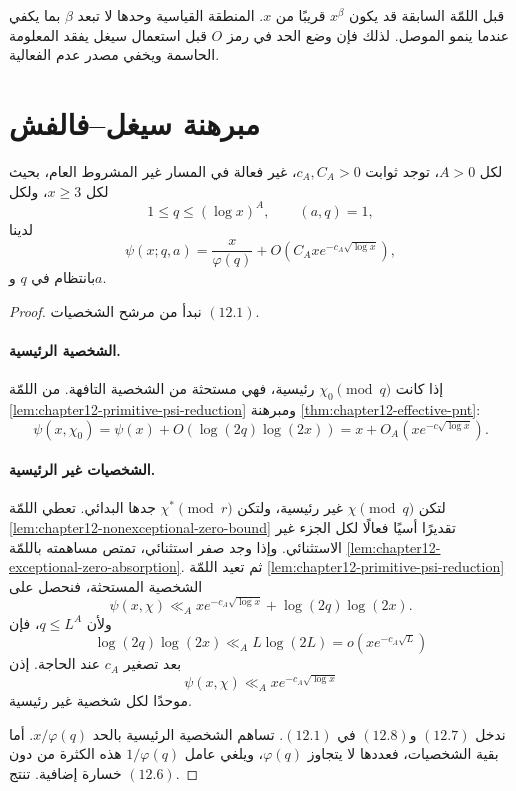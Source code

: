 \begin{remark}
قبل اللمّة السابقة قد يكون \(x^\beta\) قريبًا من \(x\). المنطقة القياسية
وحدها لا تبعد \(\beta\) بما يكفي عندما ينمو الموصل. لذلك فإن وضع الحد في
رمز \(O\) قبل استعمال سيغل يفقد المعلومة الحاسمة ويخفي مصدر عدم الفعالية.
\end{remark}

\section{مبرهنة سيغل--فالفش}

\begin{theorem}
\label{thm:chapter12-siegel-walfisz-psi}
\provedhere
لكل \(A>0\)، توجد ثوابت \(c_A,C_A>0\)، غير فعالة في المسار غير المشروط
العام، بحيث لكل \(x\ge3\)، ولكل
\[
1\le q\le(\log x)^A,
\qquad (a,q)=1,
\]
لدينا
\[
\psi(x;q,a)
=
\frac{x}{\varphi(q)}
+O\!\left(C_Axe^{-c_A\sqrt{\log x}}\right),
\tag{12.6}
\]
بانتظام في \(q\) و\(a\).
\end{theorem}

\begin{proof}
نبدأ من مرشح الشخصيات \((12.1)\).

\paragraph{الشخصية الرئيسية.}
إذا كانت \(\chi_0\pmod q\) رئيسية، فهي مستحثة من الشخصية التافهة. من
اللمّة \ref{lem:chapter12-primitive-psi-reduction} ومبرهنة
\ref{thm:chapter12-effective-pnt}:
\[
\psi(x,\chi_0)
=
\psi(x)+O(\log(2q)\log(2x))
=
x+O_A\!\left(xe^{-c\sqrt{\log x}}\right).
\tag{12.7}
\]

\paragraph{الشخصيات غير الرئيسية.}
لتكن \(\chi\pmod q\) غير رئيسية، ولتكن \(\chi^*\pmod r\) جدها البدائي.
تعطي اللمّة \ref{lem:chapter12-nonexceptional-zero-bound} تقديرًا أسيًا
فعالًا لكل الجزء غير الاستثنائي. وإذا وجد صفر استثنائي، تمتص مساهمته
باللمّة \ref{lem:chapter12-exceptional-zero-absorption}. ثم تعيد اللمّة
\ref{lem:chapter12-primitive-psi-reduction} الشخصية المستحثة، فنحصل على
\[
\psi(x,\chi)
\ll_A
xe^{-c_A\sqrt{\log x}}
+
\log(2q)\log(2x).
\]
ولأن \(q\le L^A\)، فإن
\[
\log(2q)\log(2x)
\ll_A L\log(2L)
=o\!\left(xe^{-c_A\sqrt L}\right)
\]
بعد تصغير \(c_A\) عند الحاجة. إذن
\[
\psi(x,\chi)
\ll_A xe^{-c_A\sqrt{\log x}}
\tag{12.8}
\]
موحدًا لكل شخصية غير رئيسية.

ندخل \((12.7)\) و\((12.8)\) في \((12.1)\). تساهم الشخصية الرئيسية بالحد
\(x/\varphi(q)\). أما بقية الشخصيات، فعددها لا يتجاوز \(\varphi(q)\)،
ويلغي عامل \(1/\varphi(q)\) هذه الكثرة من دون خسارة إضافية. تنتج
\((12.6)\).
\end{proof}

